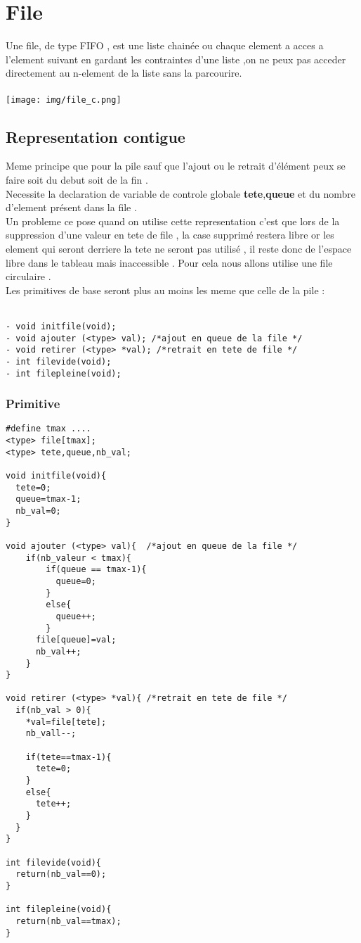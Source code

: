 \section{File}

Une file, de type FIFO , est une liste chainée ou chaque element a acces a l'element suivant en gardant les contraintes d'une liste ,on ne peux pas acceder directement au n-element de la liste sans la parcourire.\\
\\
\texttt{[image: img/file\_c.png]}
\\

\subsection{Representation contigue}

Meme principe que pour la pile sauf que l'ajout ou le retrait d'élément peux se faire soit du debut soit de la fin .\\
Necessite la declaration de variable de controle globale \textbf{tete},\textbf{queue} et du nombre d'element présent dans la file .\\
Un probleme ce pose quand on utilise cette representation c'est que lors de la suppression d'une valeur en tete de file , la case supprimé restera libre or les element qui seront derriere la tete ne seront pas utilisé , il reste donc de l'espace libre dans le tableau mais inaccessible . Pour cela nous allons utilise une file circulaire .\\

Les primitives de base seront plus au moins les meme que celle de la pile : \\
\\
\begin{verbatim}
- void initfile(void);
- void ajouter (<type> val); /*ajout en queue de la file */
- void retirer (<type> *val); /*retrait en tete de file */
- int filevide(void);
- int filepleine(void);
\end{verbatim}

\subsubsection{Primitive}
\begin{verbatim}
#define tmax ....
<type> file[tmax];
<type> tete,queue,nb_val;

void initfile(void){
  tete=0;
  queue=tmax-1;
  nb_val=0;  
}

void ajouter (<type> val){  /*ajout en queue de la file */
    if(nb_valeur < tmax){
        if(queue == tmax-1){
          queue=0;
        }
        else{
          queue++;
        }
      file[queue]=val;
      nb_val++;
    }
}

void retirer (<type> *val){ /*retrait en tete de file */
  if(nb_val > 0){
    *val=file[tete];
    nb_vall--;

    if(tete==tmax-1){
      tete=0;
    }
    else{
      tete++;
    }
  }
}

int filevide(void){
  return(nb_val==0);
}

int filepleine(void){
  return(nb_val==tmax);  
}
\end{verbatim}

